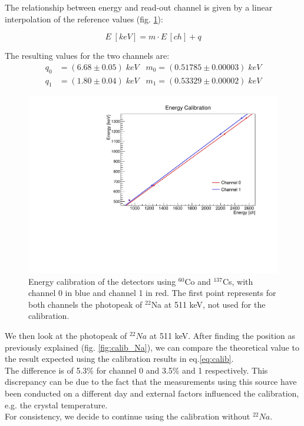 The relationship between energy and read-out channel is given by a linear interpolation of the reference values (fig. \ref{fig:cali}):

\begin{equation}
    E \; \left[keV\right] = m \cdot E \, \left[ch\right] + q
\end{equation}

The resulting values for the two channels are:
\begin{equation}
    \label{eq:calib}
    \begin{align}
        q_0 & = (6.68 \pm 0.05) \; keV \;\;\; 
        m_0   = (0.51785 \pm 0.00003) \; keV \\
        q_1 & = (1.80 \pm 0.04) \; keV \;\;\;
        m_1   = (0.53329 \pm 0.00002) \; keV	
    \end{align}
\end{equation}

\begin{figure}[H]
    \centering
    \includegraphics[scale=0.5]{Images/analysis/calibration/cali_2.pdf}
    \caption{Energy calibration of the detectors using $^{60}$Co and $^{137}$Cs, with channel 0 in blue and channel 1 in red. The first point represents for both channels the photopeak of $^{22}$Na at 511 keV, not used for the calibration.}
    \label{fig:cali}
\end{figure}


We then look at the photopeak of $^{22}Na$ at 511 keV. After finding the position as previously explained (fig. \ref{fig:calib_Na}), we can compare the theoretical value to the result expected using the calibration results in eq.\ref{eq:calib}. \\
The difference is of 5.3\% for channel 0 and 3.5\% and 1 respectively. This discrepancy can be due to the fact that the measurements using this source have been conducted on a different day and external factors influenced the calibration, e.g. the crystal temperature. \\
For consistency, we decide to continue using the calibration without $^{22}Na$.


